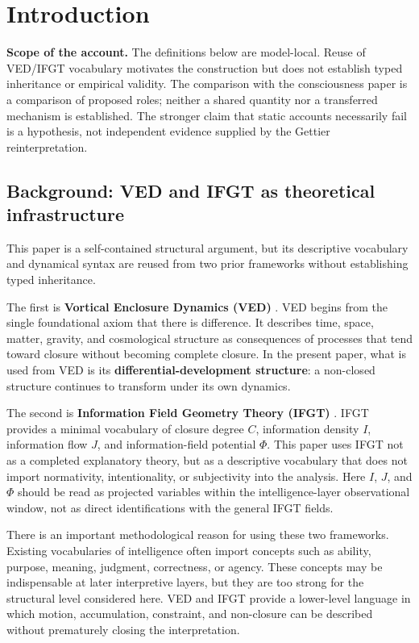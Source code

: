 \section{Introduction}

\noindent\textbf{Scope of the account.} The definitions below are model-local. Reuse of VED/IFGT vocabulary motivates the construction but does not establish typed inheritance or empirical validity. The comparison with the consciousness paper is a comparison of proposed roles; neither a shared quantity nor a transferred mechanism is established. The stronger claim that static accounts necessarily fail is a hypothesis, not independent evidence supplied by the Gettier reinterpretation.


\subsection{Background: VED and IFGT as theoretical infrastructure}

This paper is a self-contained structural argument, but its descriptive vocabulary and dynamical syntax are reused from two prior frameworks without establishing typed inheritance.

The first is \textbf{Vortical Enclosure Dynamics (VED)} \citep{VEDVol1,VEDVol2,VEDVol3,VEDVol4}. VED begins from the single foundational axiom that there is difference. It describes time, space, matter, gravity, and cosmological structure as consequences of processes that tend toward closure without becoming complete closure. In the present paper, what is used from VED is its \textbf{differential-development structure}: a non-closed structure continues to transform under its own dynamics.

The second is \textbf{Information Field Geometry Theory (IFGT)} \citep{IFGT}. IFGT provides a minimal vocabulary of closure degree $C$, information density $I$, information flow $J$, and information-field potential $\Phi$. This paper uses IFGT not as a completed explanatory theory, but as a descriptive vocabulary that does not import normativity, intentionality, or subjectivity into the analysis. Here $I$, $J$, and $\Phi$ should be read as projected variables within the intelligence-layer observational window, not as direct identifications with the general IFGT fields.

There is an important methodological reason for using these two frameworks. Existing vocabularies of intelligence often import concepts such as ability, purpose, meaning, judgment, correctness, or agency. These concepts may be indispensable at later interpretive layers, but they are too strong for the structural level considered here. VED and IFGT provide a lower-level language in which motion, accumulation, constraint, and non-closure can be described without prematurely closing the interpretation.

